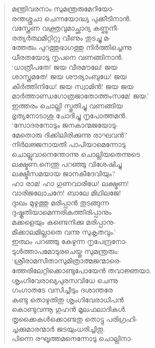 \begin{verse}
മന്ത്രിവരനാം സുമന്ത്രരുമേറിയോ-\\
രന്തശ്ശുചാ ചെന്നയോദ്ധ്യ പുക്കീടിനാന്‍.\\
വസ്ത്രേണ വക്ത്രവുമാച്ഛാദ്യ കണ്ണുനീ-\\
രത്യര്‍ത്ഥമിറ്റിറ്റു വീണും തുടച്ചു മ-\\
ത്തേരും പുറത്തുഭാഗത്തു നിര്‍ത്തിച്ചെന്നു\\
ധീരതയോടു നൃപനെ വണങ്ങിനാന്‍.\\
‘ധാത്രീപതേ! ജയ വീരമൗലേ! ജയ\\
ശാസ്ത്രമതേ! ജയ ശൗര്യാംബുധേ! ജയ\\
കീര്‍ത്തിനിധേ! ജയ സ്വാമിന്‍! ജയ ജയ\\
മാര്‍ത്താണ്ഡഗോത്രജാതോത്തംസമേ! ജയ.’\\
ഇത്തരം ചൊല്ലി സ്തുതിച്ചു വണങ്ങിയ\\
ഭൃത്യനോടാശു ചോദിച്ചു നൃപോത്തമന്‍.\\
‘സോദരനോടും ജനകാന്മജയോടു-\\
മേതൊരു ദിക്കിലിരിക്കുന്നു രാഘവന്‍?\\
നിര്‍ലജ്ജനായതി പാപിയാമെന്നോടു\\
ചൊല്ലുവാനെന്തോന്നു ചൊല്ലിയതെന്നുടെ\\
ലക്ഷ്മണ,നെന്തു പറഞ്ഞു വിശേഷിച്ചു\\
ലക്ഷ്മീസമയായ ജാനകീദേവിയും?\\
ഹാ രാമ! ഹാ ഗുണവാരിധേ! ലക്ഷ്മണ!\\
വാരിജലോചനേ! ബാലേ മിഥിലജേ!\\
ദുഃഖം മുഴുത്തു മരിപ്പാന്‍ തുടങ്ങുന്ന\\
ദുഷ്കൃതിയാമെന്നരികത്തിരിപ്പാനും\\
മക്കളെയും കണ്ടെനിക്കു മരിപ്പാനു-\\
മിക്കാലമില്ലാതെ വന്നു സുകൃതവും.’\\
ഇത്ഥം പറഞ്ഞു കേഴുന്ന നൃപേന്ദ്രനോ-\\
ടുള്‍ത്താപമോടുരചെയ്തു സുമന്ത്രരും:\\
‘ശ്രീരാമസീതാസുമിത്രാത്മജന്മാരെ-\\
ത്തേരിലേറ്റിക്കൊണ്ടുപോയേന്‍ തവാജ്ഞയാ.\\
ശൃംഗിവേരാഖ്യപുരസവിധേ ചെന്നു\\
ഗംഗാതടേ വസിച്ചീടും ദശാന്തരേ\\
കണ്ടു തൊഴുതിതു ശൃംഗിവേരാധിപന്‍\\
കൊണ്ടുവന്നൂ ഗുഹന്‍ മൂലഫലാദികള്‍.\\
തൃക്കൈകള്‍ക്കൊണ്ടതു തൊട്ടു പരിഗ്രഹി-\\
ച്ചക്കുമാരന്മാര്‍ ജടയുംധരിച്ചിതു.\\
പിന്നെ രഘൂത്തമനെന്നോടു ചൊല്ലിനാ-\\

\end{verse}
